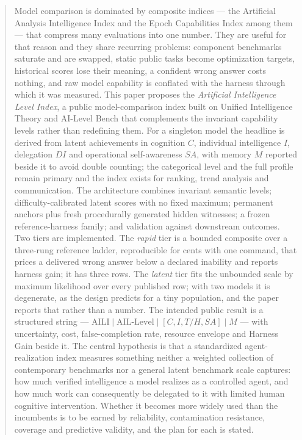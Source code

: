 \documentclass[11pt]{article}
\theoremstyle{definition}
\begin{document}
\begin{abstract}
Model comparison is dominated by composite indices --- the Artificial Analysis Intelligence Index and the Epoch Capabilities Index among them --- that compress many evaluations into one number. They are useful for that reason and they share recurring problems: component benchmarks saturate and are swapped, static public tasks become optimization targets, historical scores lose their meaning, a confident wrong answer costs nothing, and raw model capability is conflated with the harness through which it was measured. This paper proposes the \emph{Artificial Intelligence Level Index}, a public model-comparison index built on Unified Intelligence Theory and AI-Level Bench that complements the invariant capability levels rather than redefining them. For a singleton model the headline is derived from latent achievements in cognition $C$, individual intelligence $I$, delegation $DI$ and operational self-awareness $SA$, with memory $M$ reported beside it to avoid double counting; the categorical level and the full profile remain primary and the index exists for ranking, trend analysis and communication. The architecture combines invariant semantic levels; difficulty-calibrated latent scores with no fixed maximum; permanent anchors plus fresh procedurally generated hidden witnesses; a frozen reference-harness family; and validation against downstream outcomes. Two tiers are implemented. The \emph{rapid} tier is a bounded composite over a three-rung reference ladder, reproducible for cents with one command, that prices a delivered wrong answer below a declared inability and reports harness gain; it has three rows. The \emph{latent} tier fits the unbounded scale by maximum likelihood over every published row; with two models it is degenerate, as the design predicts for a tiny population, and the paper reports that rather than a number. The intended public result is a structured string --- $\mathrm{AILI} \mid \text{AIL-Level} \mid [C, I, T/H, SA] \mid M$ --- with uncertainty, cost, false-completion rate, resource envelope and Harness Gain beside it. The central hypothesis is that a standardized agent-realization index measures something neither a weighted collection of contemporary benchmarks nor a general latent benchmark scale captures: how much verified intelligence a model realizes as a controlled agent, and how much work can consequently be delegated to it with limited human cognitive intervention. Whether it becomes more widely used than the incumbents is to be earned by reliability, contamination resistance, coverage and predictive validity, and the plan for each is stated.
\end{abstract}
\end{document}
